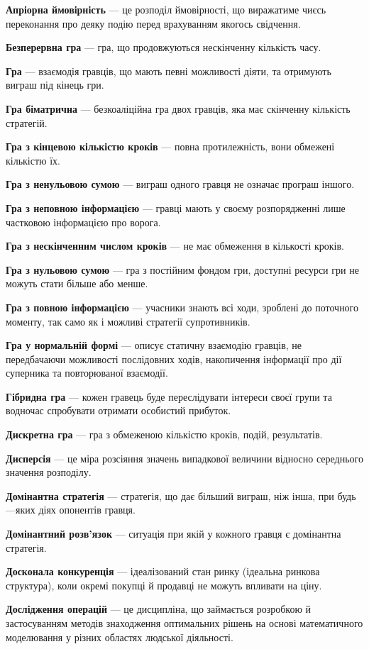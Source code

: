 \documentclass[a4paper]{article}
\begin{document}
\textbf{Апріорна ймовірність} —  це розподіл ймовірності, що виражатиме чиєсь переконання про деяку подію перед врахуванням якогось свідчення.

\textbf{Безперервна гра} — гра, що продовжуються нескінченну кількість часу.

\textbf{Гра} — взаємодія гравців, що мають певні можливості діяти, та отримують виграш під кінець гри.

\textbf{Гра біматрична} — безкоаліційна гра двох гравців, яка має скінченну кількість стратегій.

\textbf{Гра з кінцевою кількістю кроків} — повна протилежність, вони обмежені кількістю їх.

\textbf{Гра з ненульовою сумою} — виграш одного гравця не означає програш іншого.

\textbf{Гра з неповною інформацією} — гравці мають у своєму розпорядженні лише частковою інформацією про ворога.

\textbf{Гра з нескінченним числом кроків} — не має обмеження в кількості кроків.

\textbf{Гра з нульовою сумою} — гра з постійним фондом гри, доступні ресурси гри не можуть стати більше або менше.

\textbf{Гра з повною інформацією} — учасники знають всі ходи, зроблені до поточного моменту, так само як і можливі стратегії супротивників. 

\textbf{Гра у нормальній формі} — описує статичну взаємодію гравців, не передбачаючи можливості послідовних ходів, накопичення інформації про дії суперника та повторюваної взаємодії.

\textbf{Гібридна гра} — кожен гравець буде переслідувати інтереси своєї групи та водночас спробувати отримати особистий прибуток.

\textbf{Дискретна гра} — гра з обмеженою кількістю кроків, подій, результатів.

\textbf{Дисперсія} — це міра розсіяння значень випадкової величини відносно середнього значення розподілу.

\textbf{Домінантна стратегія} — стратегія, що дає більший виграш, ніж інша, при будь—яких діях опонентів гравця.

\textbf{Домінантний розв'язок} — ситуація при якій у кожного гравця є домінантна стратегія.

\textbf{Досконала конкуренція} — ідеалізований стан ринку (ідеальна ринкова структура), коли окремі покупці й продавці не можуть впливати на ціну.

\textbf{Дослідження операцій} — це дисципліна, що займається розробкою й застосуванням методів знаходження оптимальних рішень на основі математичного моделювання у різних областях людської діяльності.
\end{document}
